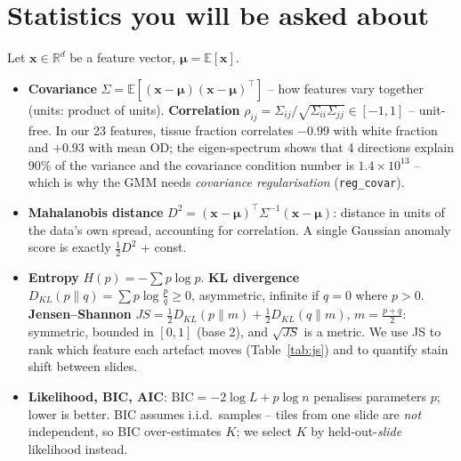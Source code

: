 \section{Statistics you will be asked about}
Let $\mathbf{x}\in\mathbb{R}^d$ be a feature vector, $\bm\mu=\mathbb{E}[\mathbf{x}]$.
\begin{itemize}
\item \textbf{Covariance} $\Sigma=\mathbb{E}[(\mathbf{x}-\bm\mu)(\mathbf{x}-\bm\mu)^\top]$ -- how features vary together
(units: product of units). \textbf{Correlation} $\rho_{ij}=\Sigma_{ij}/\sqrt{\Sigma_{ii}\Sigma_{jj}}\in[-1,1]$ -- unit-free.
In our 23 features, tissue fraction correlates $-0.99$ with white fraction and $+0.93$ with mean OD; the
eigen-spectrum shows that 4 directions explain 90\% of the variance and the covariance condition number is
$1.4\times10^{13}$ -- which is why the GMM needs \emph{covariance regularisation} (\texttt{reg\_covar}).
\item \textbf{Mahalanobis distance} $D^2=(\mathbf{x}-\bm\mu)^\top\Sigma^{-1}(\mathbf{x}-\bm\mu)$: distance in units of the data's
own spread, accounting for correlation. A single Gaussian anomaly score is exactly $\tfrac12 D^2$ + const.
\item \textbf{Entropy} $H(p)=-\sum p\log p$. \textbf{KL divergence}
$D_{KL}(p\|q)=\sum p\log\frac{p}{q}\ge 0$, asymmetric, infinite if $q=0$ where $p>0$.
\textbf{Jensen--Shannon} $JS=\tfrac12 D_{KL}(p\|m)+\tfrac12 D_{KL}(q\|m)$, $m=\tfrac{p+q}{2}$: symmetric, bounded in
$[0,1]$ (base 2), and $\sqrt{JS}$ is a metric. We use JS to rank which feature each artefact moves
(Table~\ref{tab:js}) and to quantify stain shift between slides.
\item \textbf{Likelihood, BIC, AIC}: $\mathrm{BIC}=-2\log L+p\log n$ penalises parameters $p$; lower is better.
BIC assumes i.i.d.\ samples -- tiles from one slide are \emph{not} independent, so BIC over-estimates $K$; we select $K$
by held-out-\emph{slide} likelihood instead.
\end{itemize}

